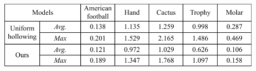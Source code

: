 
\begin{table}[htb]
\caption{\label{tab:result-statistics} Statistics of our method on various models. \#V and \#E are the number of nodes and edges, respectively. $Time$ is the computing time of our optimization process (in minutes). $Vol$ is the volume (in $mm^3$) of the resulting structure. $Ratio$ is the ratios of structure volume to the whole volume of the model. }
\centering
\includegraphics[width=\linewidth]{Tables/table2}
%
\end{table}




